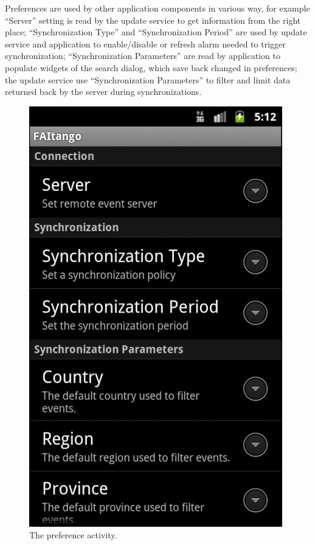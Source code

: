 \documentclass[12pt, twoside]{article}
\begin{document}
Preferences are used by other application components in various way, for example ``Server'' setting is read by the update service to get information from the right place; ``Synchronization Type'' and ``Synchronization Period'' are used by update service and application to enable/disable or refresh alarm needed to trigger synchronization; ``Synchronization Parameters'' are read by application to populate widgets of the search dialog, which save back changed in preferences; the update service use ``Synchronization Parameters'' to filter and limit data returned back by the server during synchronizations.

\begin{figure}[h]
\begin{center}
\includegraphics[scale=0.60]{fig/preference.png}
\end{center}
\caption{The preference activity.}
\label{fig:preference}
\end{figure}
\end{document}
